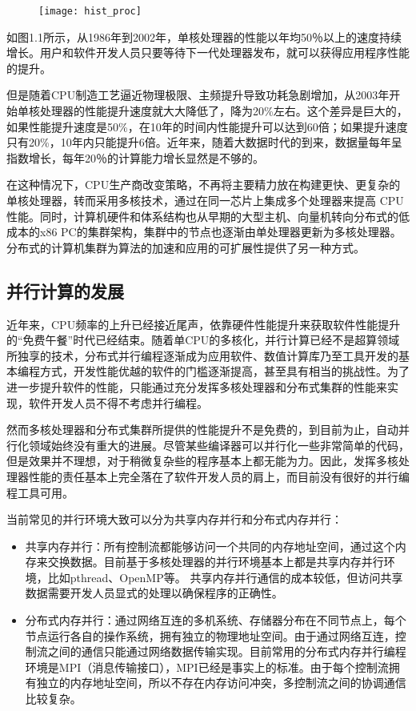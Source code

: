 \begin{figure}[!htbp]
    \centering
    \texttt{[image: hist\_proc]}
    \label{fig:hist_proc}
\end{figure}

如图1.1\citep{edwards2011arch}所示，从1986年到2002年，单核处理器的性能以年均50％以上的速度持续增长。用户和软件开发人员只要等待下一代处理器发布，就可以获得应用程序性能的提升。

但是随着CPU制造工艺逼近物理极限、主频提升导致功耗急剧增加，从2003年开始单核处理器的性能提升速度就大大降低了，降为20\%左右。这个差异是巨大的，如果性能提升速度是50\%，在10年的时间内性能提升可以达到60倍；如果提升速度只有20\%，10年内只能提升6倍\citep{pacheco2011introduction}。近年来，随着大数据时代的到来，数据量每年呈指数增长，每年20％的计算能力增长显然是不够的。

在这种情况下，CPU生产商改变策略，不再将主要精力放在构建更快、更复杂的单核处理器，转而采用多核技术，通过在同一芯片上集成多个处理器来提高 CPU性能。同时，计算机硬件和体系结构也从早期的大型主机、向量机转向分布式的低成本的x86 PC的集群架构，集群中的节点也逐渐由单处理器更新为多核处理器。分布式的计算机集群为算法的加速和应用的可扩展性提供了另一种方式。

\subsection{并行计算的发展}

近年来，CPU频率的上升已经接近尾声，依靠硬件性能提升来获取软件性能提升的“免费午餐”时代已经结束。随着单CPU的多核化，并行计算已经不是超算领域所独享的技术，分布式并行编程逐渐成为应用软件、数值计算库乃至工具开发的基本编程方式，开发性能优越的软件的门槛逐渐提高，甚至具有相当的挑战性。为了进一步提升软件的性能，只能通过充分发挥多核处理器和分布式集群的性能来实现，软件开发人员不得不考虑并行编程。

然而多核处理器和分布式集群所提供的性能提升不是免费的，到目前为止，自动并行化领域始终没有重大的进展。尽管某些编译器可以并行化一些非常简单的代码，但是效果并不理想，对于稍微复杂些的程序基本上都无能为力。因此，发挥多核处理器性能的责任基本上完全落在了软件开发人员的肩上，而目前没有很好的并行编程工具可用\citep{liuwenzhi2015paraalgo}。

当前常见的并行环境大致可以分为共享内存并行和分布式内存并行：
\begin{itemize}
	\item 共享内存并行：所有控制流都能够访问一个共同的内存地址空间，通过这个内存来交换数据。目前基于多核处理器的并行环境基本上都是共享内存并行环境，比如pthread、OpenMP等。 共享内存并行通信的成本较低，但访问共享数据需要开发人员显式的处理以确保程序的正确性。
	\item 分布式内存并行：通过网络互连的多机系统、存储器分布在不同节点上，每个节点运行各自的操作系统，拥有独立的物理地址空间。由于通过网络互连，控制流之间的通信只能通过网络数据传输实现。目前常用的分布式内存并行编程环境是MPI（消息传输接口），MPI已经是事实上的标准。由于每个控制流拥有独立的内存地址空间，所以不存在内存访问冲突，多控制流之间的协调通信比较复杂。
\end{itemize}

